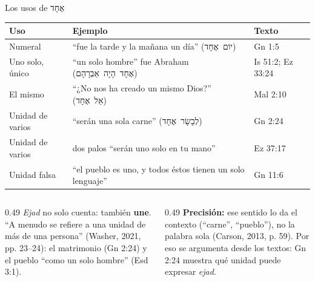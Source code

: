 \documentclass[hyperref={bookmarks=false},aspectratio=169]{beamer}
\newcommand{\heb}[1]{\mbox{\foreignlanguage{hebrew}{#1}}}
\newcommand{\destacar}[1]{\textbf{\textcolor{azul}{#1}}}
\newcommand{\precision}[1]{{\footnotesize\color{gris}\textbf{Precisión:} #1}}
\begin{document}
\begin{frame}{Los usos de \heb{אֶחָד}}
\scriptsize\renewcommand{\arraystretch}{1.15}
\begin{tabular}{@{}>{\RaggedRight\arraybackslash}p{2.6cm}>{\RaggedRight\arraybackslash}p{5.2cm}>{\RaggedRight\arraybackslash}p{4.0cm}@{}}
\toprule
\textbf{Uso} & \textbf{Ejemplo} & \textbf{Texto} \\ \midrule
Numeral & ``fue la tarde y la mañana un día'' (\heb{יוֹם אֶחָד}) & Gn 1:5 \\
Uno solo, único & ``un solo hombre'' fue Abraham (\heb{אֶחָד הָיָה אַבְרָהָם}) & Is 51:2; Ez 33:24 \\
El mismo & ``¿No nos ha creado un mismo Dios?'' (\heb{אֵל אֶחָד}) & Mal 2:10 \\
Unidad de varios & ``serán una sola carne'' (\heb{לְבָשָׂר אֶחָד}) & Gn 2:24 \\
Unidad de varios & dos palos ``serán uno solo en tu mano'' & Ez 37:17 \\
Unidad falsa & ``el pueblo es uno, y todos éstos tienen un solo lenguaje'' & Gn 11:6 \\
\bottomrule
\end{tabular}\par\medskip
\begin{columns}[t,onlytextwidth]
\begin{column}{0.49\textwidth}\small
\emph{Ejad} no solo cuenta: también \destacar{une}. ``A menudo se refiere a una unidad de más de una persona'' (Washer, 2021, pp. 23--24): el matrimonio (Gn 2:24) y el pueblo ``como un solo hombre'' (Esd 3:1).
\end{column}
\begin{column}{0.49\textwidth}
\precision{ese sentido lo da el contexto (``carne'', ``pueblo''), no la palabra sola (Carson, 2013, p. 59). Por eso se argumenta desde los textos: Gn 2:24 muestra qué unidad puede expresar \emph{ejad}.}
\end{column}
\end{columns}
\end{frame}
\end{document}
